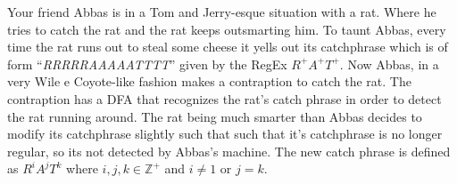 \documentclass[a4paper]{exam}
\begin{document}
\begin{questions}
	\question Your friend Abbas is in a Tom and Jerry-esque situation with a rat. Where he tries to catch the rat and the rat keeps outsmarting him. To taunt Abbas, every time the rat runs out to steal some cheese it yells out its catchphrase which is of form ``\emph{RRRRRAAAAATTTT}'' given by the RegEx $R^+A^+T^+$. Now Abbas, in a very Wile e Coyote-like fashion makes a contraption to catch the rat. The contraption has a DFA that recognizes the rat's catch phrase in order to detect the rat running around. The rat being much smarter than Abbas decides to modify its catchphrase slightly such that such that it's catchphrase is no longer regular, so its not detected by Abbas's machine. The new catch phrase is defined as $R^iA^jT^k$ where $i,j,k \in \mathbb{Z}^+$ and $i \neq 1$ or $j = k$.
\end{questions}
\end{document}
